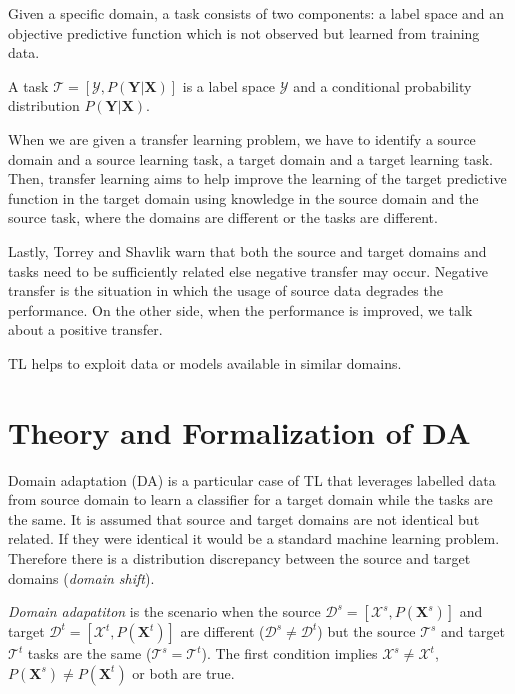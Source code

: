Given a specific domain, a task consists of two components: a label space and an objective predictive function
which is not observed but learned from training data.

\begin{definition}
	A task \(\mathcal{T} = [\mathcal{Y}, P(\mathbf{Y} | \mathbf{X})]\)
	is a label space \(\mathcal{Y}\)
	and a conditional probability distribution \(P(\mathbf{Y} | \mathbf{X})\).~\cite{pan2010}
\end{definition}

When we are given a transfer learning problem,
we have to identify a source domain and a source learning task,
a target domain and a target learning task.
Then, transfer learning aims to help improve the learning of the target predictive function in the target domain using knowledge in the source domain and the source task,
where the domains are different or the tasks are different.~\cite{pan2010}

Lastly, Torrey and Shavlik warn that both the source and target domains and tasks need to be sufficiently related
else negative transfer may occur.
Negative transfer is the situation in which the usage of source data degrades the performance.
On the other side, when the performance is improved,
we talk about a positive transfer.~\cite{torrey2010}

TL helps to exploit data or models available in similar domains.~\cite{csurka2017}

\section{Theory and Formalization of DA}

Domain adaptation (DA) is a particular case of TL
that leverages labelled data from source domain to learn a classifier for a target domain while the tasks are the same.
It is assumed that source and target domains are not identical but related.
If they were identical it would be a standard machine learning problem.
Therefore there is a distribution discrepancy between the source and target domains (\textit{domain shift}).~\cite{csurka2017}

\begin{definition}
	\textit{Domain adapatiton} is the scenario when the source
	\(\mathcal{D}^s = [\mathcal{X}^s, P(\mathbf{X}^s)]\)
	and target \(\mathcal{D}^t = [\mathcal{X}^t, P(\mathbf{X}^t)]\)
	are different (\(\mathcal{D}^s \ne \mathcal{D}^t\))
	but the source \(\mathcal{T}^s\) and target \(\mathcal{T}^t\)
	tasks are the same (\(\mathcal{T}^s = \mathcal{T}^t\)).
	The first condition implies \(\mathcal{X}^s \ne \mathcal{X}^t\),
	\(P(\mathbf{X}^s) \ne P(\mathbf{X}^t)\) or both are true.~\cite{pan2010}
\end{definition}

